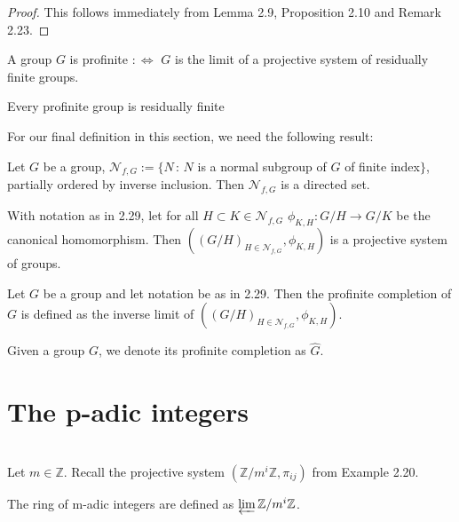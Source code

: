 \begin{proof}
This follows immediately from Lemma 2.9, Proposition 2.10 and Remark 2.23.
\end{proof}

\begin{definition}
A group $G$ is profinite $: \Leftrightarrow$ $G$ is the limit of a projective system of residually finite groups.
\end{definition}

\begin{corollary}
Every profinite group is residually finite
\end{corollary}

For our final definition in this section, we need the following result:

\begin{lemma}
Let $G$ be a group, $\mathcal{N}_{f,G} := \{ N \, : \, N$ is a normal subgroup of $G$ of finite index$\}$, partially ordered by inverse inclusion. Then $\mathcal{N}_{f,G}$ is a directed set.
\end{lemma}

\begin{lemma}
With notation as in 2.29, let for all $H \subset K \in \mathcal{N}_{f, G}$ $\phi_{K,H} : G / H \rightarrow G/K$ be the canonical homomorphism. Then $( (G/H)_{H \in \mathcal{N}_{f, G} }, \phi_{K,H} )$ is a projective system of groups.
\end{lemma}

\begin{definition}
Let $G$ be a group and let notation be as in 2.29. Then the profinite completion of $G$ is defined as the inverse limit of $( (G/H)_{H \in \mathcal{N}_{f, G} }, \phi_{K,H} )$.
\end{definition}

\begin{notation}
Given a group $G$, we denote its profinite completion as $\hat{G}$.
\end{notation}


\newpage

\section{ The p-adic integers} \hfill \\

Let $m \in \mathbb{Z}$. Recall the projective system $( \mathbb{Z} /m^i \mathbb{Z}, \pi_{ij} )$ from Example 2.20.

\begin{definition}
The ring of m-adic integers are defined as $\varprojlim \mathbb{Z} / m^i \mathbb{Z}$.
\end{definition}

